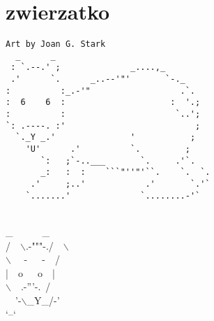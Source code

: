 \documentclass[a4paper]{article}
\begin{document}
\section{zwierzatko}
\begin{verbatim}
Art by Joan G. Stark
  _      _                        
 : `.--.' ;              _....,_  
 .'      `.      _..--'"'       `-._
:          :_.-'"                  .`.
:  6    6  :                     :  '.;
:          :                      `..';
`: .----. :'                          ;
  `._Y _.'               '           ;
    'U'      .'          `.         ; 
       `:   ;`-..___       `.     .'`.
       _:   :  :    ```"''"'``.    `.  `.
     .'     ;..'            .'       `.'`
    `.......'              `........-'`
\end{verbatim}
\ \\
\hspace*{0,15cm}\_\ \ \ \ \ \ \_\\
/\ \ $\backslash$.-"""-./\ \ $\backslash$\\
$\backslash$ \ \ -\ \ \ -\ \ /\\
\hspace*{0,1cm}|\ \ o\ \ \ o\ \ |\\
\hspace*{0,1cm}$\backslash$\ \ .-'''-.\ /\\
\ \ '-$\backslash$\_Y\_/-'\\
\hspace*{0,6cm}`--`
\end{document}
